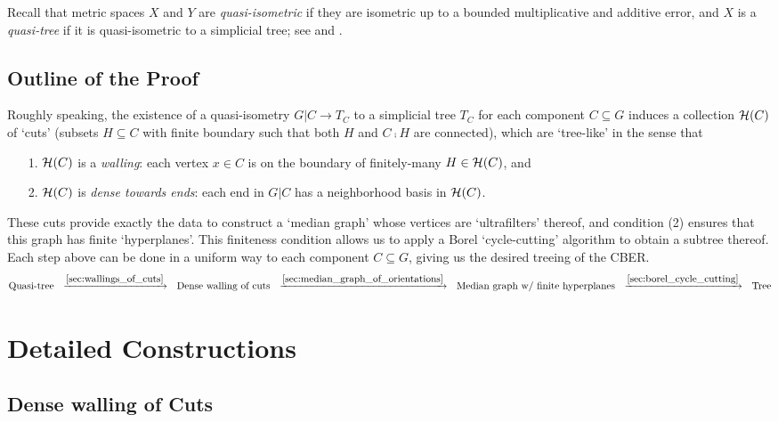 \documentclass{amsart}
\begin{document}
    Recall that metric spaces $X$ and $Y$ are \textit{quasi-isometric} if they are isometric up to a bounded multiplicative and additive error, and $X$ is a \textit{quasi-tree} if it is quasi-isometric to a simplicial tree; see \cite{Gro93} and \cite{DK18}.

    \subsection{Outline of the Proof}

    Roughly speaking, the existence of a quasi-isometry $G|C\to T_C$ to a simplicial tree $T_C$ for each component $C\subseteq G$ induces a collection $\mathcal{H}(C)$ of `cuts' (subsets $H\subseteq C$ with finite boundary such that both $H$ and $C\comp H$ are connected), which are `tree-like' in the sense that
    \begin{enumerate}
        \item[1.] $\mathcal{H}(C)$ is a \textit{walling}: each vertex $x\in C$ is on the boundary of finitely-many $H\in\mathcal{H}(C)$, and
        \item[2.] $\mathcal{H}(C)$ is \textit{dense towards ends}: each end in $G|C$ has a neighborhood basis in $\mathcal{H}(C)$.
    \end{enumerate}
    These cuts provide exactly the data to construct a `median graph' whose vertices are `ultrafilters' thereof, and condition (2) ensures that this graph has finite `hyperplanes'. This finiteness condition allows us to apply a Borel `cycle-cutting' algorithm to obtain a subtree thereof. Each step above can be done in a uniform way to each component $C\subseteq G$, giving us the desired treeing of the CBER.
    \begin{equation*}
        \textrm{Quasi-tree}\ \ \xrightarrow{\ref{sec:wallings_of_cuts}}\ \ 
        \textrm{Dense walling of cuts}\ \ \xrightarrow{\ref{sec:median_graph_of_orientations}}\ \ 
        \textrm{Median graph w/ finite hyperplanes}\ \ \xrightarrow{\ref{sec:borel_cycle_cutting}}\ \ 
        \textrm{Tree}
    \end{equation*}

    \section{Detailed Constructions}

    \subsection{Dense walling of Cuts}\label{sec:wallings_of_cuts}
\end{document}
